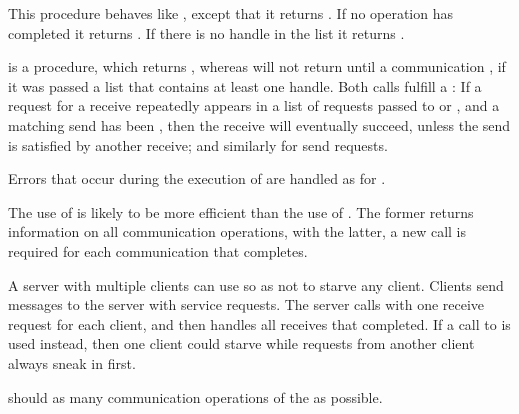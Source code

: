 This procedure behaves like , except that it returns
. If no operation has completed it
returns .
If there is no  handle in the list it
returns \mpicode{ = }.

 is a  procedure, which returns
, whereas
 will
not return until
a communication , if it was
passed a list that contains at least one  handle.  Both calls fulfill a
: If a request for a receive repeatedly
appears in a list of requests passed to  or
, and a matching send has been , then the receive
will eventually succeed, unless the send is satisfied by another receive; and
similarly for send requests.

Errors that occur during the execution of  are
handled as for \linebreak {}.

\begin{users}
The use of  is likely to be more efficient than the use
of . The former returns information on all
 communication operations, with the latter, a new call is required for
each communication that completes.

A server with multiple clients can use  so as not to
starve any client.  Clients send messages to the server with service
requests. The server calls  with one receive request
for each client, and then handles all receives that completed.
If a call to  is used instead, then one client
could starve while requests from another client always sneak in first.
\end{users}

\begin{implementors}
 should  as many
 communication operations of the  as possible.
\end{implementors}



